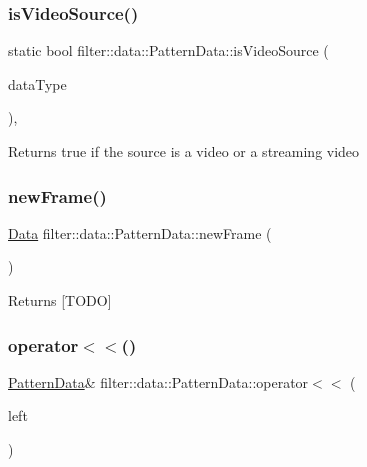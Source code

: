 \subsubsection{\texorpdfstring{is\+Video\+Source()}{isVideoSource()}}
{\footnotesize\ttfamily static bool filter\+::data\+::\+Pattern\+Data\+::is\+Video\+Source (\begin{DoxyParamCaption}\item[{I\+O\+Data\+Type}]{data\+Type }\end{DoxyParamCaption})\hspace{0.3cm}{\ttfamily [inline]}, {\ttfamily [static]}}

\begin{DoxyReturn}{Returns}
true if the source is a video or a streaming video 
\end{DoxyReturn}
\mbox{\label{classfilter_1_1data_1_1_pattern_data_ae71825f7e967464209788bf406e0abd4}} 
\subsubsection{\texorpdfstring{new\+Frame()}{newFrame()}}
{\footnotesize\ttfamily \hyperlink{classfilter_1_1data_1_1_data}{Data} filter\+::data\+::\+Pattern\+Data\+::new\+Frame (\begin{DoxyParamCaption}{ }\end{DoxyParamCaption})\hspace{0.3cm}{\ttfamily [inline]}}

\begin{DoxyReturn}{Returns}
\mbox{[}T\+O\+DO\mbox{]} 
\end{DoxyReturn}
\mbox{\label{classfilter_1_1data_1_1_pattern_data_aa01d481a29ec5690914612fb0b39e997}} 
\subsubsection{\texorpdfstring{operator$<$$<$()}{operator<<()}\hspace{0.1cm}{\footnotesize\ttfamily [1/2]}}
{\footnotesize\ttfamily \hyperlink{classfilter_1_1data_1_1_pattern_data}{Pattern\+Data}\& filter\+::data\+::\+Pattern\+Data\+::operator$<$$<$ (\begin{DoxyParamCaption}\item[{const \hyperlink{classfilter_1_1data_1_1_pattern_data}{Pattern\+Data} \&}]{left }\end{DoxyParamCaption})\hspace{0.3cm}{\ttfamily [inline]}}


